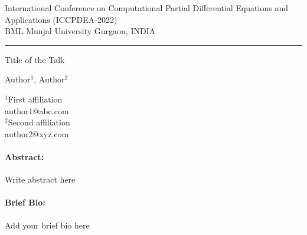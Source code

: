 \documentclass[a4paper]{article}
\begin{document}
 \thispagestyle{plain}
 \begin{minipage}[t][1cm][t]{14cm}
  \begin{flushright}
   \scriptsize
\vspace{-30pt}
   International Conference on Computational Partial Differential Equations and Applications (ICCPDEA-2022) \\
   BML Munjal University Gurgaon, INDIA \\
    \rule{14cm}{0.3mm}
  \end{flushright}
 \end{minipage}


\Large
 \begin{center}
Title of the Talk\\

\hspace{10pt}

\large
Author$^1$, Author$^2$ \\

\hspace{10pt}

\small
$^1$First affiliation\\
author1@abc.com\\
$^2$Second affiliation\\
author2@xyz.com\\

\end{center}

\hspace{10pt}

\normalsize

\paragraph{Abstract:}
Write abstract here

\paragraph{Brief Bio:}

Add your brief bio here
\end{document}
